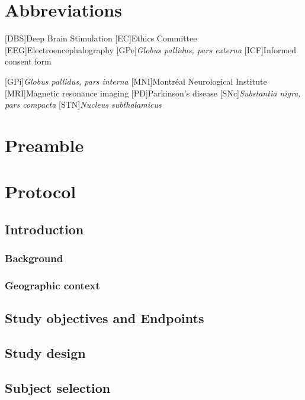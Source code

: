 \documentclass[
	a4paper, 
	11.5pt,
	headings=small, 
	twoside, 
	titlepage=firstiscover, 
 	pagesize=auto,
  	version=last,
	open=any,
	BCOR=12mm,
  	chapterprefix=false]{scrbook}
\begin{document}

\chapter*{Abbreviations}
\thispagestyle{plain}
\begin{multicols}{2}
\begin{acronym}[GABA]
[DBS]{Deep Brain Stimulation}
[EC]{Ethics Committee}
[EEG]{Electroencephalography}
[GPe]{\textit{Globus pallidus, pars externa}}
[ICF]{Informed consent form}

[GPi]{\textit{Globus pallidus, pars interna}}
[MNI]{Montréal Neurological Institute}
[MRI]{Magnetic resonance imaging}
[PD]{Parkinson's disease}
[SNc]{\textit{Substantia nigra, pars compacta}}
[STN]{\textit{Nucleus subthalamicus}}
\end{acronym}
\end{multicols}

\chapter{Preamble}
\chapter{Protocol}
\section{Introduction}
\subsection{Background}
\subsection{Geographic context}
\section{Study objectives and Endpoints}
\section{Study design}
\section{Subject selection}
\label{sec:study_selection}
\end{document}
